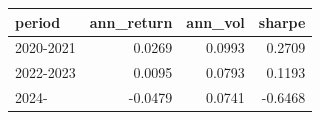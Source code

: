
\begin{tabular}{lrrr}
\toprule
period & ann\_return & ann\_vol & sharpe\\
\midrule
2020-2021 & 0.0269 & 0.0993 & 0.2709\\
2022-2023 & 0.0095 & 0.0793 & 0.1193\\
2024- & -0.0479 & 0.0741 & -0.6468\\
\bottomrule
\end{tabular}
